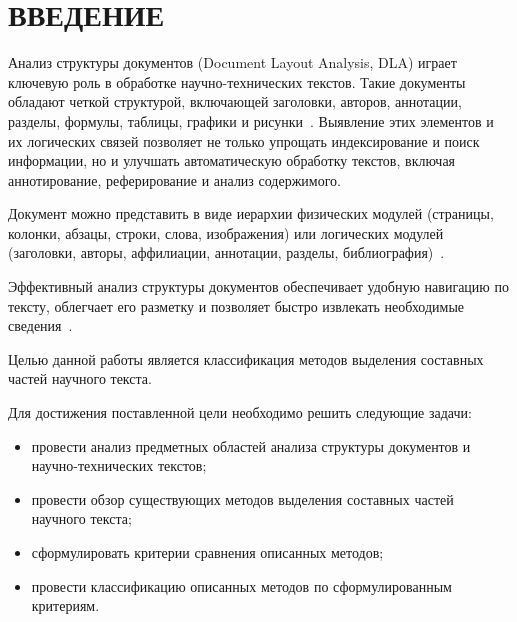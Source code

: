 \section*{ВВЕДЕНИЕ}

Анализ структуры документов (Document Layout Analysis, DLA) играет ключевую роль в обработке научно-технических текстов.
Такие документы обладают четкой структурой, включающей заголовки, авторов, аннотации, разделы, формулы, таблицы, графики и рисунки~\cite{visual-2019, dla-survey, dsaa-survey, dia-survey}.
Выявление этих элементов и их логических связей позволяет не только упрощать индексирование и поиск информации, но и улучшать автоматическую обработку текстов, включая аннотирование, реферирование и анализ содержимого.

Документ можно представить в виде иерархии физических модулей (страницы, колонки, абзацы, строки, слова, изображения) или логических модулей (заголовки, авторы, аффилиации, аннотации, разделы, библиография)~\cite{dla-book}.

Эффективный анализ структуры документов обеспечивает удобную навигацию по тексту, облегчает его разметку и позволяет быстро извлекать необходимые сведения~\cite{dla-book}.

Целью данной работы является классификация методов выделения составных частей научного текста.

Для достижения поставленной цели необходимо решить следующие задачи:
\begin{itemize}
    \item провести анализ предметных областей анализа структуры документов и научно-технических текстов;
    \item провести обзор существующих методов выделения составных частей научного текста;
    \item сформулировать критерии сравнения описанных методов;
    \item провести классификацию описанных методов по сформулированным критериям.
\end{itemize}
